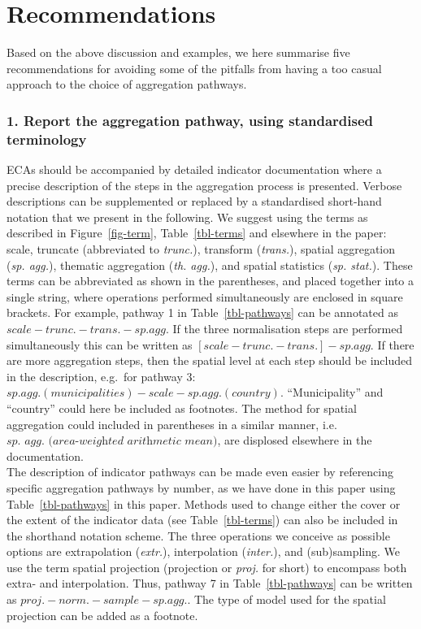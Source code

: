 \documentclass[
  authoryear,
  preprint,
  3p]{elsarticle}
\begin{document}
\section{Recommendations}\label{sec-rec}

Based on the above discussion and examples, we here summarise five
recommendations for avoiding some of the pitfalls from having a too
casual approach to the choice of aggregation pathways.

\subsubsection*{1. Report the aggregation pathway, using standardised
terminology}\label{report-the-aggregation-pathway-using-standardised-terminology}

ECAs should be accompanied by detailed indicator documentation where a
precise description of the steps in the aggregation process is
presented. Verbose descriptions can be supplemented or replaced by a
standardised short-hand notation that we present in the following. We
suggest using the terms as described in Figure~\ref{fig-term},
Table~\ref{tbl-terms} and elsewhere in the paper: scale, truncate
(abbreviated to \emph{trunc.}), transform (\emph{trans.}), spatial
aggregation (\emph{sp. agg.}), thematic aggregation (\emph{th. agg.}),
and spatial statistics (\emph{sp. stat.}). These terms can be
abbreviated as shown in the parentheses, and placed together into a
single string, where operations performed simultaneously are enclosed in
square brackets. For example, pathway 1 in Table~\ref{tbl-pathways} can
be annotated as \(scale - trunc. - trans. - sp. agg.\) If the three
normalisation steps are performed simultaneously this can be written as
\([scale - trunc. - trans.] - sp. agg.\) If there are more aggregation
steps, then the spatial level at each step should be included in the
description, e.g.~for pathway 3:
\(sp. agg. (municipalities) - scale - sp. agg. (country)\).
``Municipality'' and ``country'' could here be included as footnotes.
The method for spatial aggregation could included in parentheses in a
similar manner,
i.e.~\(\textit{sp. agg. (area-weighted arithmetic mean)}\), are
displosed elsewhere in the documentation.\\
The description of indicator pathways can be made even easier by
referencing specific aggregation pathways by number, as we have done in
this paper using Table~\ref{tbl-pathways} in this paper. Methods used to
change either the cover or the extent of the indicator data (see
Table~\ref{tbl-terms}) can also be included in the shorthand notation
scheme. The three operations we conceive as possible options are
extrapolation (\emph{extr.}), interpolation (\emph{inter.}), and
(sub)sampling. We use the term spatial projection (projection or
\emph{proj.} for short) to encompass both extra- and interpolation.
Thus, pathway 7 in Table~\ref{tbl-pathways} can be written as
\(proj. - norm. - sample - sp.agg.\). The type of model used for the
spatial projection can be added as a footnote.
\end{document}
